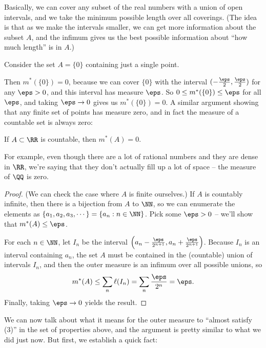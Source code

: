Basically, we can cover any subset of the real numbers with a union of open intervals, and we take the minimum possible length over all coverings. (The idea is that as we make the intervals smaller, we can get more information about the subset $A$, and the infimum gives us the best possible information about ``how much length'' is in $A$.)

\begin{example}
Consider the set $A = \{0\}$ containing just a single point. 
\end{example}

Then $m^\ast(\{0\}) = 0$, because we can cover $\{0\}$ with the interval $(-\frac{\eps}{2}, \frac{\eps}{2})$ for any $\eps > 0$, and this interval has measure $\eps$. So $0 \le m^\ast(\{0\}) \le \eps$ for all $\eps$, and taking $\eps \to 0$ gives us $m^\ast(\{0\}) = 0$. A similar argument showing that any finite set of points has measure zero, and in fact the measure of a countable set is always zero:

\begin{theorem}\label{meascountab}
If $A \subset \RR$ is countable, then $m^\ast(A) = 0$.
\end{theorem}

For example, even though there are a lot of rational numbers and they are dense in $\RR$, we're saying that they don't actually fill up a lot of space -- the measure of $\QQ$ is zero. 

\begin{proof}
(We can check the case where $A$ is finite ourselves.) If $A$ is countably infinite, then there is a bijection from $A$ to $\NN$, so we can enumerate the elements as $\{a_1, a_2, a_3, \cdots\} = \{a_n: n \in \NN\}$. Pick some $\eps > 0$ -- we'll show that $m^\ast(A) \le \eps$. 

For each $n \in \NN$, let $I_n$ be the interval $\left(a_n - \frac{\eps}{2^{n+1}}, a_n + \frac{\eps}{2^{n+1}}\right)$. Because $I_n$ is an interval containing $a_n$, the set $A$ must be contained in the (countable) union of intervals $I_n$, and then the outer measure is an infimum over all possible unions, so 
\[
    m^\ast(A) \le \sum_n \ell(I_n) = \sum_n \frac{\eps}{2^n} = \eps.
\]
Finally, taking $\eps \to 0$ yields the result.
\end{proof}

We can now talk about what it means for the outer measure to ``almost satisfy (3)'' in the set of properties above, and the argument is pretty similar to what we did just now. But first, we establish a quick fact:

